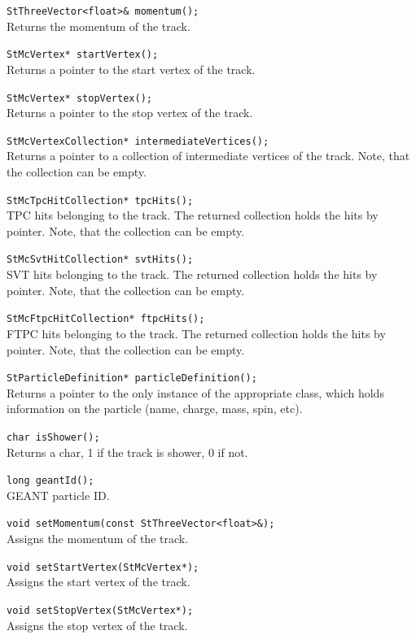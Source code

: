 \begin{Entry}
    \verb+StThreeVector<float>& momentum();+\\
    Returns the momentum of the track.

    \verb+StMcVertex* startVertex();+\\
    Returns a pointer to the start vertex of the track.

    \verb+StMcVertex* stopVertex();+\\
    Returns a pointer to the stop vertex of the track.

    \verb+StMcVertexCollection* intermediateVertices();+\\
    Returns a pointer to a collection of intermediate vertices of the track.
    Note, that the collection can be empty.

    \verb+StMcTpcHitCollection* tpcHits();+\\
    TPC hits belonging to the track.
    The returned collection holds the
    hits by pointer. Note, that the collection can be empty.

    \verb+StMcSvtHitCollection* svtHits();+\\
    SVT hits belonging to the track.
    The returned collection holds the
    hits by pointer. Note, that the collection can be empty.

    \verb+StMcFtpcHitCollection* ftpcHits();+\\
    FTPC hits belonging to the track.
    The returned collection holds the
    hits by pointer. Note, that the collection can be empty.

    \verb+StParticleDefinition* particleDefinition();+\\
    Returns a pointer to the only instance of the appropriate
     class, which holds
    information on the particle (name, charge, mass, spin, etc).

    \verb+char isShower();+\\
    Returns a char, 1 if the track is shower, 0 if not.

    \verb+long geantId();+\\
    GEANT particle ID.

    \verb+void setMomentum(const StThreeVector<float>&);+\\
    Assigns the momentum of the track.

    \verb+void setStartVertex(StMcVertex*);+\\
    Assigns the start vertex of the track.

    \verb+void setStopVertex(StMcVertex*);+\\
    Assigns the stop vertex of the track.


\end{Entry}
